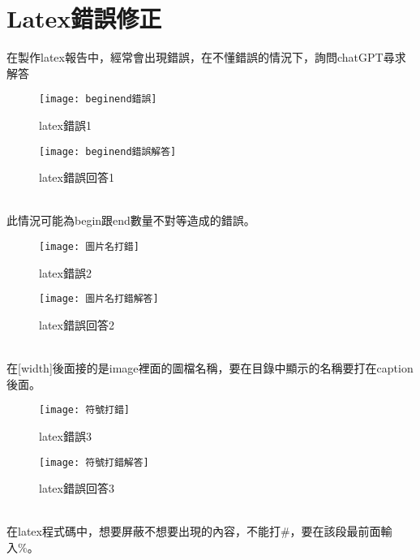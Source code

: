 \chapter{Latex錯誤修正}
在製作latex報告中，經常會出現錯誤，在不懂錯誤的情況下，詢問chatGPT尋求解答\\

\begin{figure}[ht]
  \begin{minipage}{0.5\textwidth}
    \centering
    \texttt{[image: beginend錯誤]}
    \caption{latex錯誤1}
  \end{minipage}%
  \begin{minipage}{0.5\textwidth}
    \centering
    \texttt{[image: beginend錯誤解答]}
    \caption{latex錯誤回答1}
  \end{minipage}
\end{figure}\\

此情況可能為begin跟end數量不對等造成的錯誤。\\

\begin{figure}[ht]
  \begin{minipage}{0.5\textwidth}
    \centering
    \texttt{[image: 圖片名打錯]}
    \caption{latex錯誤2}
  \end{minipage}%
  \begin{minipage}{0.5\textwidth}
    \centering
    \texttt{[image: 圖片名打錯解答]}
    \caption{latex錯誤回答2}
  \end{minipage}
\end{figure}\\

在[width]後面接的是image裡面的圖檔名稱，要在目錄中顯示的名稱要打在caption後面。\\

\begin{figure}[ht]
  \begin{minipage}{0.5\textwidth}
    \centering
    \texttt{[image: 符號打錯]}
    \caption{latex錯誤3}
  \end{minipage}%
  \begin{minipage}{0.5\textwidth}
    \centering
    \texttt{[image: 符號打錯解答]}
    \caption{latex錯誤回答3}
  \end{minipage}
\end{figure}\\

在latex程式碼中，想要屏蔽不想要出現的內容，不能打\#，要在該段最前面輸入\%。\\

